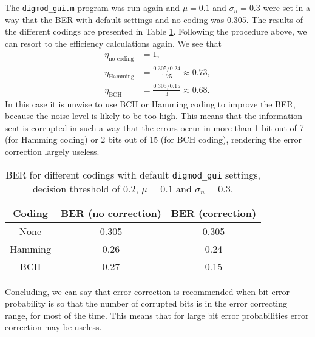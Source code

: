 \documentclass[11pt,titlepage]{report}
\begin{document}
The \texttt{digmod\_gui.m} program was run again and $\mu=0.1$ and $\sigma_n=0.3$ were set in a way that the BER with default settings and no coding was \num{0.305}. The results of the different codings are presented in Table \ref{tab:task4-diff-coding-mu-sigma}. Following the procedure above, we can resort to the efficiency calculations again. We see that
\begin{align*}
\eta_{\text{no coding}}&=1,\\
\eta_{\text{Hamming}}&=\frac{0.305/0.24}{1.75}\approx0.73,\\
\eta_{\text{BCH}}&=\frac{0.305/0.15}{3}\approx0.68.
\end{align*}
In this case it is unwise to use BCH or Hamming coding to improve the BER, because the noise level is likely to be too high. This means that the information sent is corrupted in such a way that the errors occur in more than \num{1} bit out of \num{7} (for Hamming coding) or \num{2} bits out of \num{15} (for BCH coding), rendering the error correction largely useless.
\begin{table}[H]
	\centering
	\caption{BER for different codings with default \texttt{digmod\_gui} settings, decision threshold of 0.2, $\mu=0.1$ and $\sigma_n=0.3$.}
	\label{tab:task4-diff-coding-mu-sigma}
	\begin{tabular}{c c c}
		\hline\hline
		Coding & BER (no correction) & BER (correction)\\
		\hline
		None & 0.305 & 0.305\\
		Hamming & 0.26 & 0.24 \\
		BCH & 0.27 & 0.15\\
		\hline
	\end{tabular}
\end{table}

Concluding, we can say that error correction is recommended when bit error probability is so that the number of corrupted bits is in the error correcting range, for most of the time. This means that for large bit error probabilities error correction may be useless.
\end{document}
